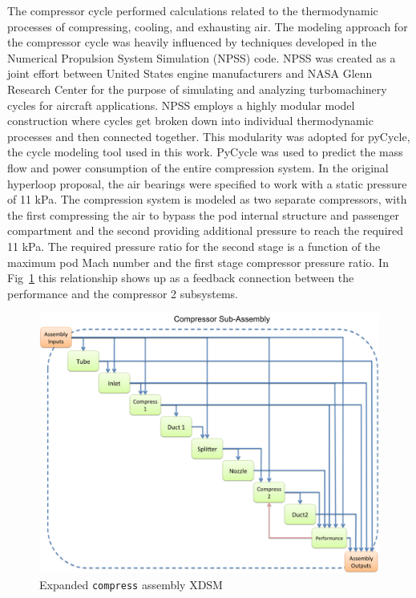 \documentclass[heading.tex]{subfiles}
\begin{document}
The compressor cycle performed calculations related to the thermodynamic processes of compressing, cooling, and exhausting air. 
The modeling approach for the compressor cycle was heavily influenced by techniques developed in the Numerical Propulsion System Simulation (NPSS) code. 
NPSS was created as a joint effort between United States engine manufacturers and NASA Glenn Research Center for the purpose of 
simulating and analyzing turbomachinery cycles for aircraft applications\cite{Lytle}. NPSS employs a highly modular model construction
where cycles get broken down into individual thermodynamic processes and then connected together. This modularity was adopted for pyCycle, 
the cycle modeling tool used in this work. PyCycle was used to predict the mass flow and power consumption of the entire compression system. 
In the original hyperloop proposal, the air bearings were specified to work with a static pressure of 11 kPa. The compression system is modeled as two separate compressors, with the first compressing the air to bypass the pod internal structure and passenger compartment and the second providing additional pressure to reach the required 11 kPa. The required pressure ratio for the second stage
is a function of the maximum pod Mach number and the first stage compressor pressure ratio. In Fig~\ref{f:compressorXDSM} this relationship 
shows up as a feedback connection between the performance and the compressor 2 subsystems. 

\begin{figure}[H]
\centering
\includegraphics[width=\textwidth]{images/compAssembly.png}
\caption{Expanded \texttt{compress} assembly XDSM}
\label{f:compressorXDSM}
\end{figure}
\end{document}
